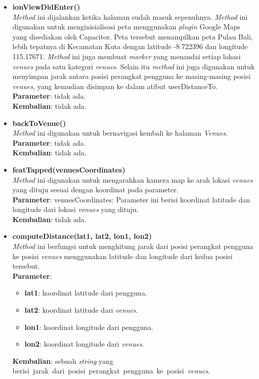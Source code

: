 \begin{enumerate}
\begin{itemize}
					\item \textbf{ionViewDidEnter()} \\
						\textit{Method} ini dijalankan ketika halaman sudah masuk sepenuhnya. \textit{Method} ini digunakan untuk menginisialisasi peta menggunakan \textit{plugin} Google Maps yang disediakan oleh Capacitor. Peta tersebut menampilkan peta Pulau Bali, lebih tepatnya di Kecamatan Kuta dengan latitude -8.722396 dan longitude 115.17671. \textit{Method} ini juga membuat \textit{marker} yang menandai setiap lokasi \textit{venues} pada satu kategori \textit{venues}. Selain itu \textit{method} ini juga digunakan untuk menyimpan jarak antara posisi perangkat pengguna ke masing-masing posisi \textit{venues}, yang kemudian disimpan ke dalam atibut userDistanceTo.\\
						\textbf{Parameter}: tidak ada. \\
						\textbf{Kembalian}: tidak ada.
						
					\item \textbf{backToVenue()} \\
						\textit{Method} ini digunakan untuk bernavigasi kembali ke halaman \textit{Venues}. \\
						\textbf{Parameter}: tidak ada. \\
						\textbf{Kembalian}: tidak ada.
						
					\item \textbf{featTapped(venuesCoordinates)} \\
						\textit{Method} ini digunakan untuk mengarahkan kamera map ke arah lokasi \textit{venues} yang dituju sesuai dengan koordinat pada parameter. \\
						\textbf{Parameter}: venuesCoordinates: Parameter ini berisi koordinat latitude dan longitude dari lokasi \textit{venues} yang dituju. \\
						\textbf{Kembalian}: tidak ada.
						
					\item \textbf{computeDistance(lat1, lat2, lon1, lon2)} \\
						\textit{Method} ini berfungsi untuk menghitung jarak dari posisi perangkat pengguna ke posisi \textit{venues} menggunakan latitude dan longitude dari kedua posisi tersebut.\\
						\textbf{Parameter}: 
						\begin{itemize}
							\item \textbf{lat1}: koordinat latitude dari pengguna.
							\item \textbf{lat2}: koordinat latitude dari \textit{venues}.
							\item \textbf{lon1}: koordinat longitude dari pengguna.
							\item \textbf{lon2}: koordinat longitude dari \textit{venues}.
						\end{itemize}
						\textbf{Kembalian}: sebuah \textit{string} yang berisi~jarak~dari~posisi~perangkat~pengguna~ke~posisi~\textit{venues}.
				\end{itemize}
\end{enumerate}

